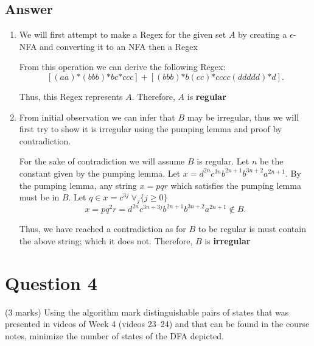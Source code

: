 \documentclass[12pt]{book}
\begin{document}
\subsection*{Answer}
\begin{enumerate}[label=\alph*)]
        \item We will first attempt to make a Regex for the given set $A$ by creating a  $\epsilon$-NFA and converting it to an
                NFA then a Regex

                From this operation we can derive the following Regex:
                 \[
                [(aa)\text{*}(bbb)\text{*}bc\text{*}ccc] + [(bbb)\text{*}b(cc)\text{*}cccc(ddddd)\text{*}d]
                .\] 

                Thus, this Regex represents $A$. Therefore,  $A$ is \textbf{regular}
                
        \item From initial observation we can infer that $B$ may be irregular, thus we will first try to show it is irregular using the
                pumping lemma and proof by contradiction.

                For the sake of contradiction we will assume $B$ is regular. Let  $n$ be the constant given by the pumping lemma. 
                Let $x=d^{2n} c^{3n} b^{2n+1} b^{3n+2} a^{2n+1}$.
                By the pumping lemma, any string $x=pqr$ which satisfies the pumping lemma must be in  $B$.
               Let $q\in x = c^{3j}\;\forall_j\{j\geq 0\}$ 
                \[
                x = pq^2r = d^{2n} c^{3n+3j} b^{2n+1} b^{3n+2} a^{2n+1} \not\in B
                .\] 
                
                Thus, we have reached a contradiction as for $B$ to be regular is must contain the above string; which it does not.
                Therefore,  $B$ is \textbf{irregular}
\end{enumerate}
\pagebreak


\section*{Question 4}
{\small(3 marks) Using the algorithm mark distinguishable pairs of states that was presented in
videos of Week 4 (videos 23–24) and that can be found in the course notes, minimize the
number of states of the DFA depicted.}
\end{document}
